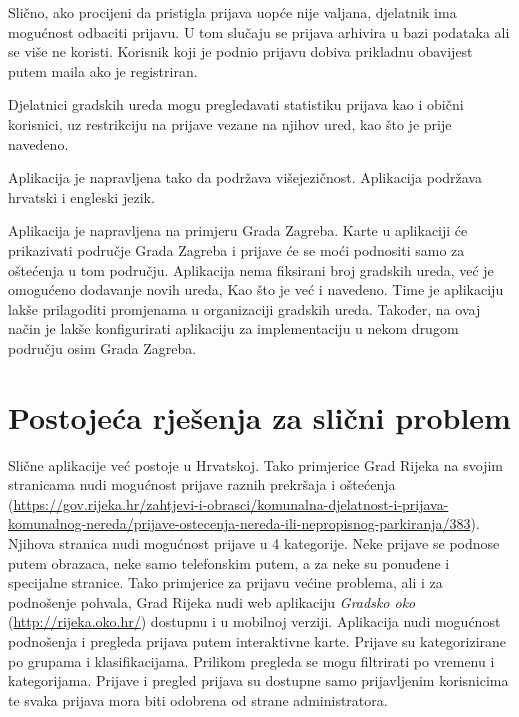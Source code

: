 		Slično, ako procijeni da pristigla prijava uopće nije valjana, djelatnik ima mogućnost odbaciti prijavu. U tom slučaju se prijava arhivira u bazi podataka ali se više ne koristi. Korisnik koji je podnio prijavu dobiva prikladnu obavijest putem maila ako je registriran.
		
		Djelatnici gradskih ureda mogu pregledavati statistiku prijava kao i obični korisnici, uz restrikciju na prijave vezane na njihov ured, kao što je prije navedeno.
		
		Aplikacija je napravljena tako da podržava višejezičnost. Aplikacija podržava hrvatski i engleski jezik.
		
		Aplikacija je napravljena na primjeru Grada Zagreba. Karte u aplikaciji će prikazivati područje Grada Zagreba i prijave će se moći podnositi samo za oštećenja u tom području. Aplikacija nema fiksirani broj gradskih ureda, već je omogućeno dodavanje novih ureda, Kao što je već i navedeno. Time je aplikaciju lakše prilagoditi promjenama u organizaciji gradskih ureda. Također, na ovaj način je lakše konfigurirati aplikaciju za implementaciju u nekom drugom području osim Grada Zagreba.
		\eject
		
		\section{Postojeća rješenja za slični problem}
		
			Slične aplikacije već postoje u Hrvatskoj. Tako primjerice Grad Rijeka na svojim stranicama nudi mogućnost prijave raznih prekršaja i oštećenja (\url{https://gov.rijeka.hr/zahtjevi-i-obrasci/komunalna-djelatnost-i-prijava-komunalnog-nereda/prijave-ostecenja-nereda-ili-nepropisnog-parkiranja/383}). Njihova stranica nudi mogućnost prijave u 4 kategorije. Neke prijave se podnose putem obrazaca, neke samo telefonskim putem, a za neke su ponuđene i specijalne stranice. Tako primjerice za prijavu većine problema, ali i za podnošenje pohvala, Grad Rijeka nudi web aplikaciju \textit{Gradsko oko} (\url{http://rijeka.oko.hr/}) dostupnu i u mobilnoj verziji. Aplikacija nudi mogućnost podnošenja i pregleda prijava putem interaktivne karte. Prijave su kategorizirane po grupama i klasifikacijama. Prilikom pregleda se mogu filtrirati po vremenu i kategorijama. Prijave i pregled prijava su dostupne samo prijavljenim korisnicima te svaka prijava mora biti odobrena od strane administratora.
		
